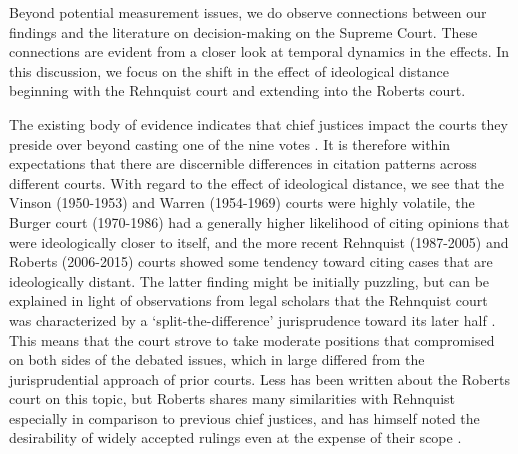 \documentclass{cup-pan}
\begin{document}
Beyond potential measurement issues, we do observe connections between our findings and the literature on decision-making on the Supreme Court. These connections are evident from a closer look at temporal dynamics in the effects. In this discussion, we focus on the shift in the effect of ideological distance beginning with the Rehnquist court and extending into the Roberts court. 

The existing body of evidence indicates that chief justices impact the courts they preside over beyond casting one of the nine votes \citep{cross2005decisional,danelski2016chief}. It is therefore within expectations that there are discernible differences in citation patterns across different courts. With regard to the effect of ideological distance, we see that the Vinson (1950-1953) and Warren (1954-1969) courts were highly volatile, the Burger court (1970-1986) had a generally higher likelihood of citing opinions that were ideologically closer to itself, and the more recent Rehnquist (1987-2005) and Roberts (2006-2015) courts showed some tendency toward citing cases that are ideologically distant. The latter finding might be initially puzzling, but can be explained in light of observations from legal scholars that the Rehnquist court was characterized by a `split-the-difference' jurisprudence toward its later half \citep{wilkinson2005rehnquist,basiak2006roberts}. This means that the court strove to take moderate positions that compromised on both sides of the debated issues, which in large differed from the jurisprudential approach of prior courts. Less has been written about the Roberts court on this topic, but Roberts shares many similarities with Rehnquist especially in comparison to previous chief justices, and has himself noted the desirability of widely accepted rulings even at the expense of their scope \citep{pomerance2018center,sunstein2008trimming}.
\end{document}
